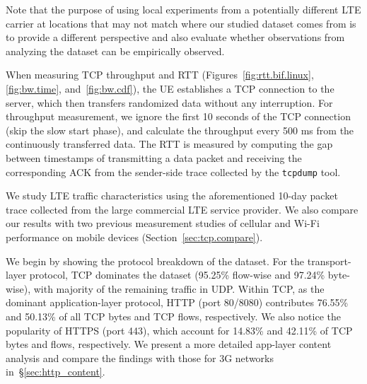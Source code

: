 Note that the purpose of using local experiments from a potentially different LTE carrier at locations that may not match where our studied dataset comes from is to provide a different perspective and also evaluate whether observations from analyzing the dataset can be empirically observed.

When measuring TCP throughput and RTT (Figures~\ref{fig:rtt.bif.linux},\ref{fig:bw.time}, and~\ref{fig:bw.cdf}), the UE establishes a TCP connection to the server, which then transfers randomized data without any interruption.
For throughput measurement, we ignore the first 10 seconds of the TCP connection (skip the slow start phase), and calculate the throughput every 500 ms from the continuously transferred data. The RTT is measured by computing the gap between timestamps of transmitting a data packet and receiving the corresponding ACK from the sender-side trace collected by the \texttt{tcpdump} tool.




\label{sec:tcp.char}

We study LTE traffic characteristics using the aforementioned 10-day packet trace collected from the large commercial LTE service provider. We also compare our results with two previous measurement studies of cellular and Wi-Fi performance on mobile devices (Section~\ref{sec:tcp.compare}).


\label{subsec:char_flow}

We begin by showing the protocol breakdown of the dataset. For the transport-layer protocol, TCP dominates the dataset (95.25\% flow-wise and 97.24\% byte-wise), with majority of the remaining traffic in UDP. Within TCP, as the dominant application-layer protocol, HTTP (port 80/8080) contributes 76.55\% and 50.13\% of all TCP bytes and TCP flows, respectively. We also notice the popularity of HTTPS (port 443), which account for 14.83\% and 42.11\% of TCP bytes and flows, respectively. We present a more detailed app-layer content analysis and compare the findings with those for 3G networks in~\S\ref{sec:http_content}.

